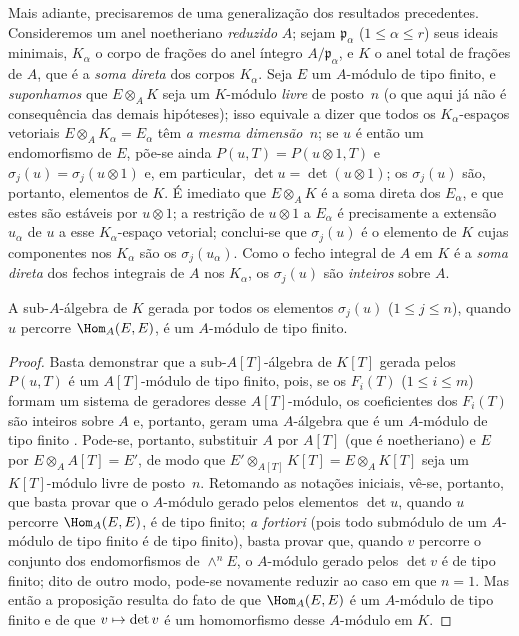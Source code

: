 \documentclass[oneside,10pt]{amsart}
\makeatletter
\renewcommand{\leq}{\leqslant}
\newcommand{\ega@arrow}[2]{\mathchoice{#1}{#2}{#2}{#2}}
\let\ega@shortmapsto\mapsto
\renewcommand{\mapsto}{\ega@arrow{\longmapsto}{\ega@shortmapsto}}
\newcommand{\oldpage}[2][]{\marginnote{\normalfont\footnotesize\textbf{#1}~|~#2}\ignorespaces}
\let\EGAOriginalLabel\label
\renewcommand{\label}[1]{\phantomsection\EGAOriginalLabel{#1}}
\makeatother
\begin{document}
\begin{remark}[6.4.7]
\label{II.6.4.7}
Mais adiante, precisaremos de uma generalização dos resultados precedentes.
Consideremos um anel noetheriano \emph{reduzido} $A$;
sejam $\mathfrak{p}_\alpha$ ($1\leq\alpha\leq r$) seus ideais minimais, $K_\alpha$ o corpo de frações do anel íntegro $A/\mathfrak{p}_\alpha$, e $K$ o anel total de frações de $A$, que é a \emph{soma direta} dos corpos $K_\alpha$.
Seja $E$ um $A$-módulo de tipo finito, e \emph{suponhamos} que $E\otimes_A K$ seja um $K$-módulo \emph{livre} de posto~$n$ (o que aqui já não é consequência das demais hipóteses);
isso equivale a dizer que todos os $K_\alpha$-espaços vetoriais $E\otimes_A K_\alpha=E_\alpha$ têm \emph{a mesma dimensão~$n$};
se $u$ é então um endomorfismo de $E$, põe-se ainda $P(u,T)=P(u\otimes1,T)$ e $\sigma_j(u)=\sigma_j(u\otimes1)$ e, em particular, $\det u=\det(u\otimes1)$;
os $\sigma_j(u)$ são, portanto, elementos de $K$.
É imediato que $E\otimes_A K$ é a soma direta dos $E_\alpha$, e que estes são estáveis por $u\otimes1$;
a restrição de $u\otimes1$ a $E_\alpha$ é precisamente a extensão $u_\alpha$ de $u$ a esse $K_\alpha$-espaço vetorial;
conclui-se que $\sigma_j(u)$ é o elemento de $K$ cujas componentes nos $K_\alpha$ são os $\sigma_j(u_\alpha)$.
Como o fecho integral de $A$ em $K$ é a \emph{soma direta} dos fechos integrais de $A$ nos $K_\alpha$, os $\sigma_j(u)$ são \emph{inteiros} sobre $A$.

\begin{lemma}[6.4.7.1]
\label{II.6.4.7.1}
A sub-$A$-álgebra de $K$ gerada por todos os elementos $\sigma_j(u)$ ($1\leq j\leq n$), quando $u$ percorre $\Hom_A(E,E)$, é um $A$-módulo de tipo finito.
\end{lemma}

\begin{proof}
Basta demonstrar que a sub-$A[T]$-álgebra de $K[T]$ gerada pelos $P(u,T)$ é um $A[T]$-módulo de tipo finito, pois, se os $F_i(T)$ ($1\leq i\leq m$) formam um sistema de geradores desse $A[T]$-módulo, os coeficientes dos $F_i(T)$ são inteiros sobre $A$ e, portanto, geram uma $A$-álgebra que é um $A$-módulo de tipo finito \cite[t.~I, p.~255, th.~1]{I-13}.
Pode-se, portanto,
\oldpage[II]{123}
substituir $A$ por $A[T]$ (que é noetheriano) e $E$ por $E\otimes_A A[T]=E'$, de modo que $E'\otimes_{A[T]}K[T]=E\otimes_A K[T]$ seja um $K[T]$-módulo livre de posto~$n$.
Retomando as notações iniciais, vê-se, portanto, que basta provar que o $A$-módulo gerado pelos elementos $\det u$, quando $u$ percorre $\Hom_A(E,E)$, é de tipo finito;
\emph{a fortiori} (pois todo submódulo de um $A$-módulo de tipo finito é de tipo finito), basta provar que, quando $v$ percorre o conjunto dos endomorfismos de $\wedge^n E$, o $A$-módulo gerado pelos $\det v$ é de tipo finito;
dito de outro modo, pode-se novamente reduzir ao caso em que $n=1$.
Mas então a proposição resulta do fato de que $\Hom_A(E,E)$ é um $A$-módulo de tipo finito e de que $v\mapsto\det v$ é um homomorfismo desse $A$-módulo em $K$.
\end{proof}


\end{remark}
\end{document}

